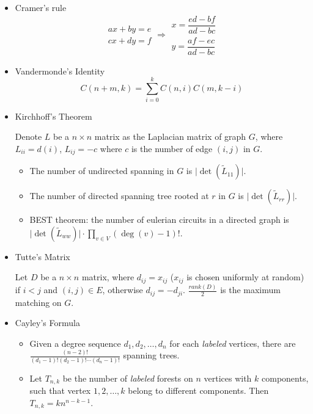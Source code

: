 \begin{itemize}
\item Cramer's rule
$$
\begin{aligned}ax+by=e\\cx+dy=f\end{aligned}
\Rightarrow
\begin{aligned}x=\dfrac{ed-bf}{ad-bc}\\y=\dfrac{af-ec}{ad-bc}\end{aligned}
$$

\item Vandermonde's Identity
$$
C(n + m, k) = \sum_{i=0}^k C(n, i)C(m, k - i)
$$

\item Kirchhoff's Theorem

Denote $L$ be a $n \times n$ matrix as the Laplacian matrix of graph $G$, where $L_{ii} = d(i)$, $L_{ij} = -c$ where $c$ is the number of edge $(i, j)$ in $G$.
\begin{itemize}
    \item The number of undirected spanning in $G$ is $\lvert \det(\tilde{L}_{11}) \rvert$.
    \item The number of directed spanning tree rooted at $r$ in $G$ is $\lvert \det(\tilde{L}_{rr}) \rvert$.
    \item BEST theorem: the number of eulerian circuits in a directed graph is $\lvert \det(\tilde{L}_{ww}) \rvert \cdot \prod_{v \in V} (\deg(v)-1)!$.
\end{itemize}

\item Tutte's Matrix

Let $D$ be a $n \times n$ matrix, where $d_{ij} = x_{ij}$ ($x_{ij}$ is chosen uniformly at random) if $i < j$ and $(i, j) \in E$, otherwise $d_{ij} = -d_{ji}$. $\frac{rank(D)}{2}$ is the maximum matching on $G$.

\item Cayley's Formula

\begin{itemize}
  \item Given a degree sequence $d_1, d_2, \ldots, d_n$ for each \textit{labeled} vertices, there are $\frac{(n - 2)!}{(d_1 - 1)!(d_2 - 1)!\cdots(d_n - 1)!}$ spanning trees.
  \item Let $T_{n, k}$ be the number of \textit{labeled} forests on $n$ vertices with $k$ components, such that vertex $1, 2, \ldots, k$ belong to different components. Then $T_{n, k} = kn^{n - k - 1}$.
\end{itemize}


\end{itemize}

